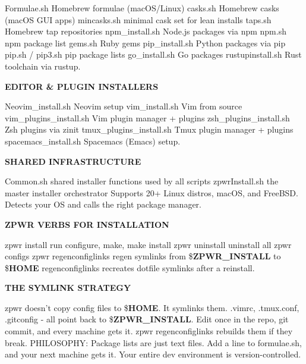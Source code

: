 \documentclass[11pt,a4paper,twoside]{book}
\begin{document}
Formulae.sh        Homebrew formulae (macOS/Linux) casks.sh           Homebrew casks (macOS GUI apps) mincasks.sh        minimal cask set for lean installs taps.sh            Homebrew tap repositories npm\_install.sh     Node.js packages via npm npm.sh             npm package list gems.sh            Ruby gems pip\_install.sh     Python packages via pip pip.sh / pip3.sh   pip package lists go\_install.sh      Go packages rustupinstall.sh   Rust toolchain via rustup.


\vspace{12pt}
{\bfseries\color{neonyellow} \textbf{EDITOR} \& PLUGIN INSTALLERS}\vspace{4pt}

Neovim\_install.sh       Neovim setup vim\_install.sh          Vim from source vim\_plugins\_install.sh  Vim plugin manager + plugins zsh\_plugins\_install.sh  Zsh plugins via zinit tmux\_plugins\_install.sh Tmux plugin manager + plugins spacemacs\_install.sh    Spacemacs (Emacs) setup.


\vspace{12pt}
{\bfseries\color{neonyellow} SHARED INFRASTRUCTURE}\vspace{4pt}

Common.sh  shared installer functions used by all scripts zpwrInstall.sh  the master installer orchestrator Supports 20+ Linux distros, macOS, and FreeBSD. Detects your OS and calls the right package manager.


\vspace{12pt}
{\bfseries\color{neonyellow} \textbf{ZPWR} VERBS FOR INSTALLATION}\vspace{4pt}

zpwr install            run configure, make, make install zpwr uninstall          uninstall all zpwr configs zpwr regenconfiglinks   regen symlinks from \$\textbf{ZPWR\_INSTALL} to \$\textbf{HOME} regenconfiglinks recreates dotfile symlinks after a reinstall.


\vspace{12pt}
{\bfseries\color{neonyellow} THE SYMLINK STRATEGY}\vspace{4pt}

zpwr doesn't copy config files to \$\textbf{HOME}. It symlinks them. .vimrc, .tmux.conf, .gitconfig - all point back to \$\textbf{ZPWR\_INSTALL}. Edit once in the repo, git commit, and every machine gets it. zpwr regenconfiglinks rebuilds them if they break. PHILOSOPHY: Package lists are just text files. Add a line to formulae.sh, and your next machine gets it. Your entire dev environment is version-controlled.
\end{document}
